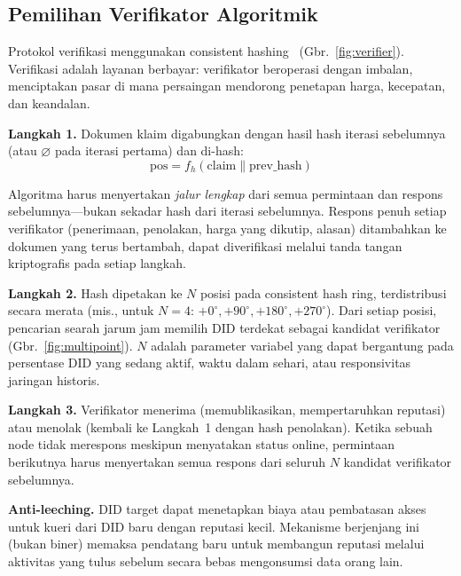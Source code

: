 \documentclass[11pt,a4paper,twocolumn]{article}
\begin{document}
\subsection{Pemilihan Verifikator Algoritmik}

Protokol verifikasi menggunakan consistent hashing~\cite{karger1997} (Gbr.~\ref{fig:verifier}). Verifikasi adalah layanan berbayar: verifikator beroperasi dengan imbalan, menciptakan pasar di mana persaingan mendorong penetapan harga, kecepatan, dan keandalan.

\textbf{Langkah 1.} Dokumen klaim digabungkan dengan hasil hash iterasi sebelumnya (atau $\varnothing$ pada iterasi pertama) dan di-hash:
\begin{equation}
\text{pos} = f_h(\text{claim} \| \text{prev\_hash})
\label{eq:hash}
\end{equation}

Algoritma harus menyertakan \emph{jalur lengkap} dari semua permintaan dan respons sebelumnya---bukan sekadar hash dari iterasi sebelumnya. Respons penuh setiap verifikator (penerimaan, penolakan, harga yang dikutip, alasan) ditambahkan ke dokumen yang terus bertambah, dapat diverifikasi melalui tanda tangan kriptografis pada setiap langkah.

\textbf{Langkah 2.} Hash dipetakan ke $N$ posisi pada consistent hash ring, terdistribusi secara merata (mis., untuk $N=4$: $+0^{\circ}, +90^{\circ}, +180^{\circ}, +270^{\circ}$). Dari setiap posisi, pencarian searah jarum jam memilih DID terdekat sebagai kandidat verifikator (Gbr.~\ref{fig:multipoint}). $N$ adalah parameter variabel yang dapat bergantung pada persentase DID yang sedang aktif, waktu dalam sehari, atau responsivitas jaringan historis.

\textbf{Langkah 3.} Verifikator menerima (memublikasikan, mempertaruhkan reputasi) atau menolak (kembali ke Langkah~1 dengan hash penolakan). Ketika sebuah node tidak merespons meskipun menyatakan status online, permintaan berikutnya harus menyertakan semua respons dari seluruh $N$ kandidat verifikator sebelumnya.

\textbf{Anti-leeching.} DID target dapat menetapkan biaya atau pembatasan akses untuk kueri dari DID baru dengan reputasi kecil. Mekanisme berjenjang ini (bukan biner) memaksa pendatang baru untuk membangun reputasi melalui aktivitas yang tulus sebelum secara bebas mengonsumsi data orang lain.
\end{document}
